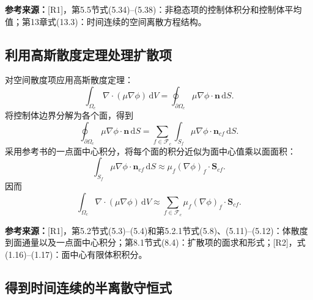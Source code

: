 \documentclass[UTF8,12pt,a4paper]{ctexart}
\numberwithin{equation}{section}
\newcommand{\Rone}{\textnormal{[R1]}}
\newcommand{\Rtwo}{\textnormal{[R2]}}
\newcommand{\source}[1]{%
  \par\smallskip
  \noindent\colorbox{sourcebg}{%
    \parbox{0.955\linewidth}{\raggedright\footnotesize\color{sourcegray}\textbf{参考来源：}#1}%
  }
  \par\smallskip
}
\newcommand{\dd}{\,\mathrm d}
\newcommand{\Sf}{\bm S}
\begin{document}
\source{\Rone，第5.5节式(5.34)--(5.38)：非稳态项的控制体积分和控制体平均值；第13章式(13.3)：时间连续的空间离散方程结构。}

\subsection{利用高斯散度定理处理扩散项}

对空间散度项应用高斯散度定理：
\begin{equation}
  \int_{\Omega_c}\nabla\cdot(\mu\nabla\phi)\dd V
  =\oint_{\partial\Omega_c}\mu\nabla\phi\cdot\bm n\dd S.
  \label{eq:gauss_theorem}
\end{equation}
将控制体边界分解为各个面，得到
\begin{equation}
  \oint_{\partial\Omega_c}\mu\nabla\phi\cdot\bm n\dd S
  =\sum_{f\in\mathcal F_c}
    \int_{S_f}\mu\nabla\phi\cdot\bm n_{cf}\dd S.
  \label{eq:boundary_face_sum}
\end{equation}
采用参考书的一点面中心积分，将每个面的积分近似为面中心值乘以面面积：
\begin{equation}
  \int_{S_f}\mu\nabla\phi\cdot\bm n_{cf}\dd S
  \approx
  \mu_f(\nabla\phi)_f\cdot\Sf_{cf}.
  \label{eq:face_midpoint}
\end{equation}
因而
\begin{equation}
  \int_{\Omega_c}\nabla\cdot(\mu\nabla\phi)\dd V
  \approx
  \sum_{f\in\mathcal F_c}
  \mu_f(\nabla\phi)_f\cdot\Sf_{cf}.
  \label{eq:diffusion_face_sum}
\end{equation}

\source{\Rone，第5.2节式(5.3)--(5.4)和第5.2.1节式(5.8)、(5.11)--(5.12)：体散度到面通量以及一点面中心积分；第8.1节式(8.4)：扩散项的面求和形式；\Rtwo，式(1.16)--(1.17)：面中心有限体积积分。}

\subsection{得到时间连续的半离散守恒式}
\end{document}

